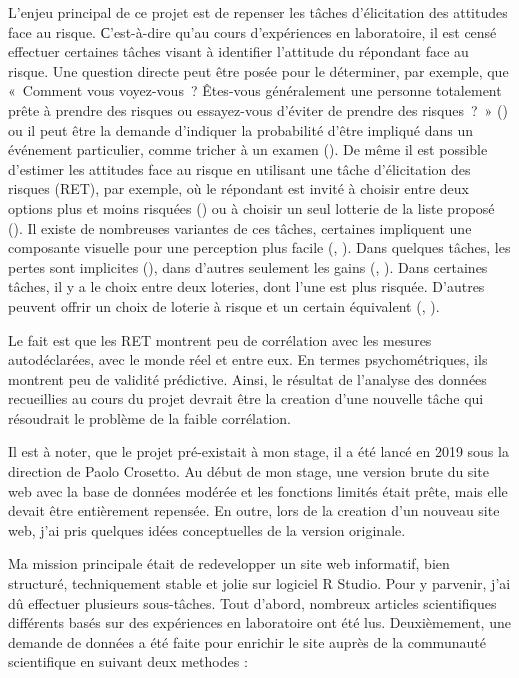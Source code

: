 \documentclass[12pt]{article}
\begin{document}
L'enjeu principal de ce projet est de repenser les tâches d'élicitation
des attitudes face au risque. С'est-à-dire qu'au cours d'expériences en
laboratoire, il est censé effectuer certaines tâches visant à identifier
l'attitude du répondant face au risque. Une question directe peut être
posée pour le déterminer, par exemple, que «~Comment vous voyez-vous~?
Êtes-vous généralement une personne totalement prête à prendre des
risques ou essayez-vous d'éviter de prendre des risques~?~»
(\citet{SOEP2007}) ou il peut être la demande d'indiquer la probabilité
d'être impliqué dans un événement particulier, comme tricher à un examen
(\citet{Blais2006}). De même il est possible d'estimer les attitudes
face au risque en utilisant une tâche d'élicitation des risques (RET),
par exemple, où le répondant est invité à choisir entre deux options
plus et moins risquées (\citet{Holt2002}) ou à choisir un seul lotterie
de la liste proposé (\citet{Eckel2002}). Il existe de nombreuses
variantes de ces tâches, certaines impliquent une composante visuelle
pour une perception plus facile (\citet{Hunt2005},
\citet{Crosetto2013}). Dans quelques tâches, les pertes sont implicites
(\citet{Menkhoff_Sakha_2017}), dans d'autres seulement les gains
(\citet{Eckel2002}, \citet{Holt2002}). Dans certaines tâches, il y a le
choix entre deux loteries, dont l'une est plus risquée. D'autres peuvent
offrir un choix de loterie à risque et un certain équivalent
(\citet{Menkhoff_Sakha_2017}, \citet{Csermely2014}).

Le fait est que les RET montrent peu de corrélation avec les mesures
autodéclarées, avec le monde réel et entre eux. En termes
psychométriques, ils montrent peu de validité prédictive. Ainsi, le
résultat de l'analyse des données recueillies au cours du projet devrait
être la creation d'une nouvelle tâche qui résoudrait le problème de la
faible corrélation.

Il est à noter, que le projet pré-existait à mon stage, il a été lancé
en 2019 sous la direction de Paolo Crosetto. Au début de mon stage, une
version brute du site web avec la base de données modérée et les
fonctions limités était prête, mais elle devait être entièrement
repensée. En outre, lors de la creation d'un nouveau site web, j'ai pris
quelques idées conceptuelles de la version originale.

Ma mission principale était de redevelopper un site web informatif, bien
structuré, techniquement stable et jolie sur logiciel R Studio. Pour y
parvenir, j'ai dû effectuer plusieurs sous-tâches. Tout d'abord,
nombreux articles scientifiques différents basés sur des expériences en
laboratoire ont été lus. Deuxièmement, une demande de données a été
faite pour enrichir le site auprès de la communauté scientifique en
suivant deux methodes :
\end{document}
